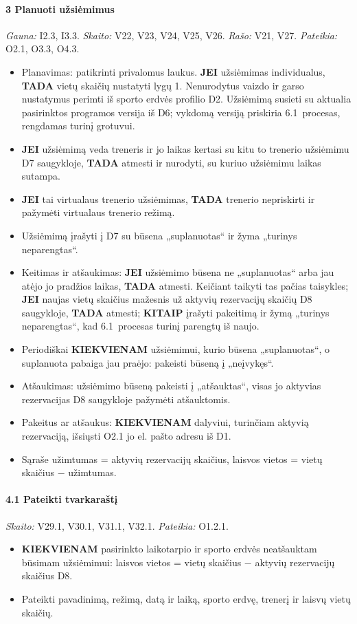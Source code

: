 \paragraph{3 Planuoti užsiėmimus}\mbox{}\par
{\small \textit{Gauna:} I2.3, I3.3. \textit{Skaito:} V22, V23, V24, V25, V26. \textit{Rašo:} V21, V27. \textit{Pateikia:} O2.1, O3.3, O4.3.}
\begin{itemize}
  \item Planavimas: patikrinti privalomus laukus. \textbf{JEI} užsiėmimas individualus, \textbf{TADA} vietų skaičių nustatyti lygų 1. Nenurodytus vaizdo ir garso nustatymus perimti iš sporto erdvės profilio D2. Užsiėmimą susieti su aktualia pasirinktos programos versija iš D6; vykdomą versiją priskiria 6.1~procesas, rengdamas turinį grotuvui.
  \item \textbf{JEI} užsiėmimą veda treneris ir jo laikas kertasi su kitu to trenerio užsiėmimu D7 saugykloje, \textbf{TADA} atmesti ir nurodyti, su kuriuo užsiėmimu laikas sutampa.
  \item \textbf{JEI} tai virtualaus trenerio užsiėmimas, \textbf{TADA} trenerio nepriskirti ir pažymėti virtualaus trenerio režimą.
  \item Užsiėmimą įrašyti į D7 su būsena „suplanuotas“ ir žyma „turinys neparengtas“.
  \item Keitimas ir atšaukimas: \textbf{JEI} užsiėmimo būsena ne „suplanuotas“ arba jau atėjo jo pradžios laikas, \textbf{TADA} atmesti. Keičiant taikyti tas pačias taisykles; \textbf{JEI} naujas vietų skaičius mažesnis už aktyvių rezervacijų skaičių D8 saugykloje, \textbf{TADA} atmesti; \textbf{KITAIP} įrašyti pakeitimą ir žymą „turinys neparengtas“, kad 6.1~procesas turinį parengtų iš naujo.
  \item Periodiškai \textbf{KIEKVIENAM} užsiėmimui, kurio būsena „suplanuotas“, o suplanuota pabaiga jau praėjo: pakeisti būseną į „neįvykęs“.
  \item Atšaukimas: užsiėmimo būseną pakeisti į „atšauktas“, visas jo aktyvias rezervacijas D8 saugykloje pažymėti atšauktomis.
  \item Pakeitus ar atšaukus: \textbf{KIEKVIENAM} dalyviui, turinčiam aktyvią rezervaciją, išsiųsti O2.1 jo el. pašto adresu iš D1.
  \item Sąraše užimtumas = aktyvių rezervacijų skaičius, laisvos vietos = vietų skaičius $-$ užimtumas.
\end{itemize}
\paragraph{4.1 Pateikti tvarkaraštį}\mbox{}\par
{\small \textit{Skaito:} V29.1, V30.1, V31.1, V32.1. \textit{Pateikia:} O1.2.1.}
\begin{itemize}
  \item \textbf{KIEKVIENAM} pasirinkto laikotarpio ir sporto erdvės neatšauktam būsimam užsiėmimui: laisvos vietos = vietų skaičius $-$ aktyvių rezervacijų skaičius D8.
  \item Pateikti pavadinimą, režimą, datą ir laiką, sporto erdvę, trenerį ir laisvų vietų skaičių.
\end{itemize}
